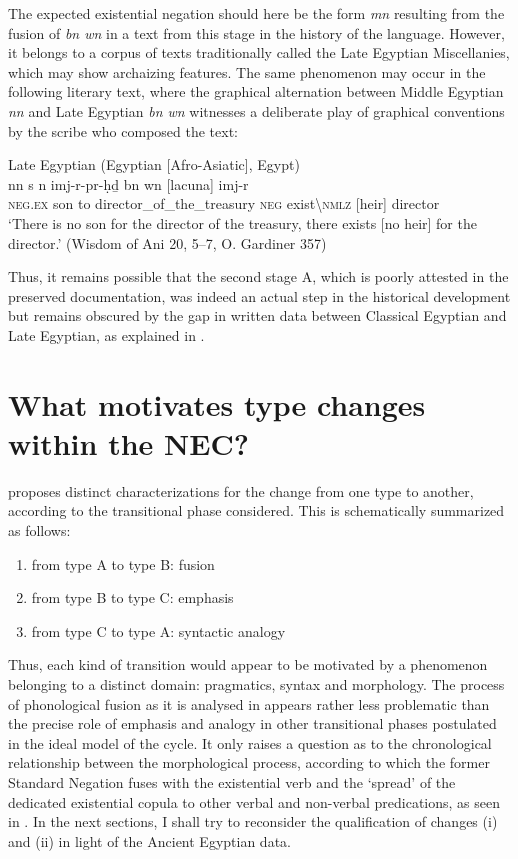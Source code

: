 \documentclass[output=paper,draft,draftmode,colorlinks,citecolor=brown]{langscibook}
\begin{document}
The expected existential negation should here be the form \textit{mn} resulting from the fusion of \textit{bn wn} in a text from this stage in the history of the language. However, it belongs to a corpus of texts traditionally called the Late Egyptian Miscellanies, which may show archaizing features. The same phenomenon may occur in the following literary text, where the graphical alternation between Middle Egyptian \textit{nn} and Late Egyptian \textit{bn wn} witnesses a deliberate play of graphical conventions by the scribe who composed the text:  

\ea Late Egyptian (Egyptian [Afro-Asiatic], Egypt) \label{ex:AE52}\\
    \gll nn        s{\ꜣ} n imj-r{\ꜣ}-pr-ḥḏ               bn          wn                              [lacuna] imj-r{\ꜣ}\\
    \textsc{neg.ex} son to  director\_of\_the\_treasury \textsc{neg} exist\textbackslash\textsc{nmlz} [heir] director\\
    \glt ‘There is no son for the director of the treasury, there exists [no heir] for the director.’ (Wisdom of Ani 20, 5–7, O. Gardiner 357) 
\z 

Thus, it remains possible that the second stage A, which is poorly attested in the preserved documentation, was indeed an actual step in the historical development but remains obscured by the gap in written data between Classical Egyptian and Late Egyptian, as explained in .

\section{What motivates type changes within the NEC?}\label{s:AE4}

\citet{Croft1991} proposes distinct characterizations for the change from one type to another, according to the transitional phase considered. This is schematically summarized as follows: 

\begin{enumerate}[label=(\roman*)]
    \item from type A to type B: fusion 
    \item from type B to type C: emphasis 
    \item from type C to type A: syntactic analogy 
\end{enumerate}

Thus, each kind of transition would appear to be motivated by a phenomenon belonging to a distinct domain: pragmatics, syntax and morphology. The process of phonological fusion as it is analysed in \citet{Croft1991} appears rather less problematic than the precise role of emphasis and analogy in other transitional phases postulated in the ideal model of the cycle. It only raises a question as to the chronological relationship between the morphological process, according to which the former Standard Negation fuses with the existential verb and the ‘spread’ of the dedicated existential copula to other verbal and non-verbal predications, as seen in . In the next sections, I shall try to reconsider the qualification of changes (i) and (ii) in light of the Ancient Egyptian data.
\end{document}
